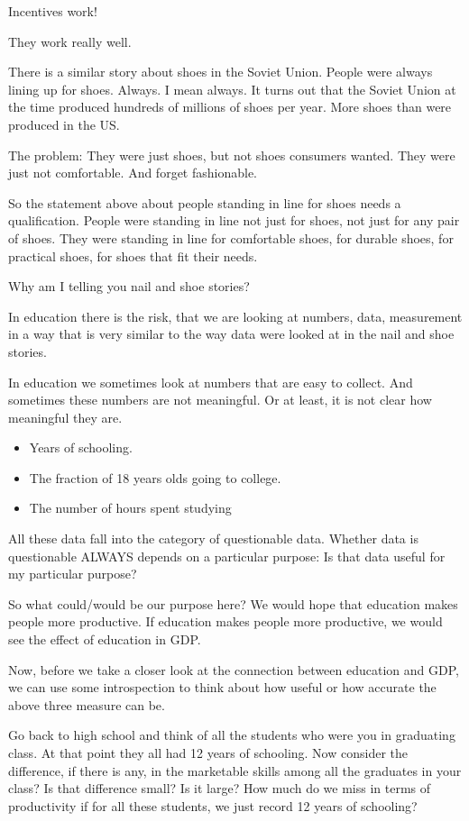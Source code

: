 \documentclass[
]{book}
\providecommand{\tightlist}{%
  \setlength{\itemsep}{0pt}\setlength{\parskip}{0pt}}
\begin{document}
Incentives work!

They work really well.

There is a similar story about shoes in the Soviet Union. People were always lining up for shoes. Always. I mean always. It turns out that the Soviet Union at the time produced hundreds of millions of shoes per year. More shoes than were produced in the US.

The problem: They were just shoes, but not shoes consumers wanted. They were just not comfortable. And forget fashionable.

So the statement above about people standing in line for shoes needs a qualification. People were standing in line not just for shoes, not just for any pair of shoes. They were standing in line for comfortable shoes, for durable shoes, for practical shoes, for shoes that fit their needs.

Why am I telling you nail and shoe stories?

In education there is the risk, that we are looking at numbers, data, measurement in a way that is very similar to the way data were looked at in the nail and shoe stories.

In education we sometimes look at numbers that are easy to collect. And sometimes these numbers are not meaningful. Or at least, it is not clear how meaningful they are.

\begin{itemize}
\tightlist
\item
  Years of schooling.
\item
  The fraction of 18 years olds going to college.
\item
  The number of hours spent studying
\end{itemize}

All these data fall into the category of questionable data. Whether data is questionable ALWAYS depends on a particular purpose: Is that data useful for my particular purpose?

So what could/would be our purpose here? We would hope that education makes people more productive. If education makes people more productive, we would see the effect of education in GDP.

Now, before we take a closer look at the connection between education and GDP, we can use some introspection to think about how useful or how accurate the above three measure can be.

Go back to high school and think of all the students who were you in graduating class. At that point they all had 12 years of schooling. Now consider the difference, if there is any, in the marketable skills among all the graduates in your class? Is that difference small? Is it large? How much do we miss in terms of productivity if for all these students, we just record 12 years of schooling?
\end{document}
